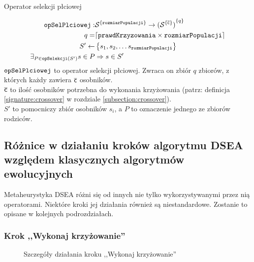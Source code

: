 \documentclass[./FM_mgr.tex]{subfiles}
\begin{document}
\begin{signature}
	\caption{Operator selekcji płciowej \label{signature:genSel}}
	\begin{align}
	\mathtt{opSelPlciowej}: &{ \mathcal{S}}^{ \{ \mathtt{rozmiarPopulacji}  \}} \rightarrow { ( {\mathcal{S}  }^{ \{ \mathsf{\overline{c}} \}} ) }^{ \{ q \}} \\
	q = & \lceil \mathtt{prawdKrzyzowania} \times \mathtt{rozmiarPopulacji} \rceil \\
	S' \gets &\left\{ s_1, s_2, \ldots s_{\mathtt{rozmiarPopulacji}} \right\} \\
	\exists_{P \in \mathtt{opSelekcji}(S')} s \in P &\Rightarrow s \in S'\\
	\end{align}	
	$\mathtt{opSelPlciowej}$ to operator selekcji płciowej.
	Zwraca on zbiór $q$ zbiorów, z których każdy zawiera $\mathsf{\overline{c}}$ osobników. \\
	$\mathsf{\overline{c}}$ to ilość osobników potrzebna do wykonania krzyżowania (patrz: definicja \ref{signature:crossover} w rozdziale \ref{subsection:crossover}). \\
	$S'$ to pomocniczy zbiór osobników $s_i$, a $P$ to oznaczenie jednego ze zbiorów rodziców.
\end{signature}

\subsection{Różnice w działaniu kroków algorytmu DSEA względem klasycznych algorytmów ewolucyjnych}

Metaheurystyka DSEA różni się od innych nie tylko wykorzystywanymi przez nią operatorami.
Niektóre kroki jej działania również są niestandardowe.
Zostanie to opisane w kolejnych podrozdziałach.

\subsubsection{Krok ,,Wykonaj krzyżowanie''} \label{subsubsection:my_crossover}

\begin{figure}[H]
	\caption{Szczegóły działania kroku ,,Wykonaj krzyżowanie'' \label{figure:my_crossover}}
\end{figure}
\end{document}
